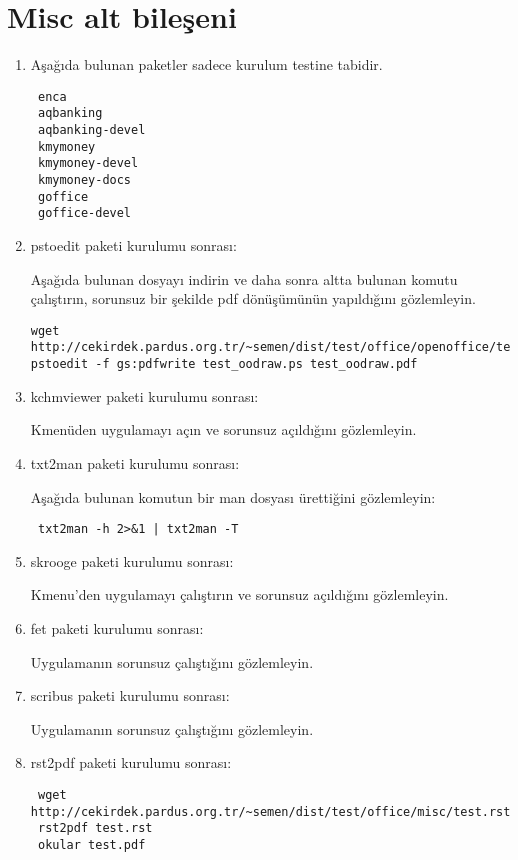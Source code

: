 \documentclass[a4paper,10pt]{article}
\begin{document}
\section{Misc alt bileşeni}
\begin{enumerate}

\item Aşağıda bulunan paketler sadece kurulum testine tabidir.

\begin{verbatim}
 enca
 aqbanking
 aqbanking-devel
 kmymoney
 kmymoney-devel
 kmymoney-docs
 goffice
 goffice-devel
\end{verbatim}
\item pstoedit paketi kurulumu sonrası:

Aşağıda bulunan dosyayı indirin ve daha sonra altta bulunan komutu çalıştırın, sorunsuz bir şekilde pdf dönüşümünün yapıldığını gözlemleyin.
\begin{verbatim}
wget http://cekirdek.pardus.org.tr/~semen/dist/test/office/openoffice/test_oodraw.ps
pstoedit -f gs:pdfwrite test_oodraw.ps test_oodraw.pdf 
\end{verbatim}

\item kchmviewer paketi kurulumu sonrası:

Kmenüden uygulamayı açın ve sorunsuz açıldığını gözlemleyin.

\item txt2man paketi kurulumu sonrası:

Aşağıda bulunan komutun bir man dosyası ürettiğini gözlemleyin:

\begin{verbatim}
 txt2man -h 2>&1 | txt2man -T
\end{verbatim}

\item skrooge paketi kurulumu sonrası:

Kmenu'den uygulamayı çalıştırın ve sorunsuz açıldığını gözlemleyin.

\item fet paketi kurulumu sonrası:

Uygulamanın sorunsuz çalıştığını gözlemleyin.

\item scribus paketi kurulumu sonrası:

Uygulamanın sorunsuz çalıştığını gözlemleyin.

\item rst2pdf paketi kurulumu sonrası:

\begin{verbatim}
 wget http://cekirdek.pardus.org.tr/~semen/dist/test/office/misc/test.rst
 rst2pdf test.rst
 okular test.pdf
\end{verbatim}


\end{enumerate}
\end{document}
